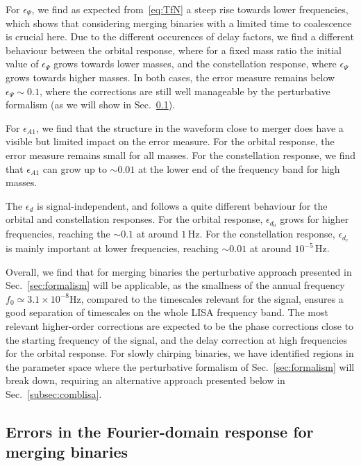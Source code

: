 \documentclass[aps,showpacs,twocolumn,
prd,superscriptaddress,nofootinbib]{revtex4-1}
\newcommand{\Hz}{\,\mathrm{Hz}}
\begin{document}
For $\epsilon_{\Psi}$, we find as expected from~\eqref{eq:TfN} a steep rise towards lower frequencies, which shows that considering merging binaries with a limited time to coalescence is crucial here. Due to the different occurences of delay factors, we find a different behaviour between the orbital response, where for a fixed mass ratio the initial value of $\epsilon_{\Psi}$ grows towards lower masses, and the constellation response, where $\epsilon_{\Psi}$ grows towards higher masses. In both cases, the error measure remains below $\epsilon_{\Psi} \sim 0.1$, where the corrections are still well manageable by the perturbative formalism (as we will show in Sec.~\ref{subsec:errorsLISA}).

For $\epsilon_{A1}$, we find that the structure in the waveform close to merger does have a visible but limited impact on the error measure. For the orbital response, the error measure remains small for all masses. For the constellation response, we find that $\epsilon_{A1}$ can grow up to $\sim 0.01$ at the lower end of the frequency band for high masses.

The $\epsilon_{d}$ is signal-independent, and follows a quite different behaviour for the orbital and constellation responses. For the orbital response, $\epsilon_{d_{0}}$ grows for higher frequencies, reaching the $\sim 0.1$ at around $1\Hz$. For the constellation response, $\epsilon_{d_{c}}$ is mainly important at lower frequencies, reaching $\sim 0.01$ at around $10^{-5}\Hz$.

Overall, we find that for merging binaries the perturbative approach presented in Sec.~\ref{sec:formalism} will be applicable, as the smallness of the annual frequency $f_{0} \simeq 3.1\times10^{-8}\mathrm{Hz}$, compared to the timescales relevant for the signal, ensures a good separation of timescales on the whole LISA frequency band. The most relevant higher-order corrections are expected to be the phase corrections close to the starting frequency of the signal, and the delay correction at high frequencies for the orbital response. For slowly chirping binaries, we have identified regions in the parameter space where the perturbative formalism of Sec.~\ref{sec:formalism} will break down, requiring an alternative approach presented below in Sec.~\ref{subsec:comblisa}.


\subsection{Errors in the Fourier-domain response for merging binaries}
\label{subsec:errorsLISA}
\end{document}
